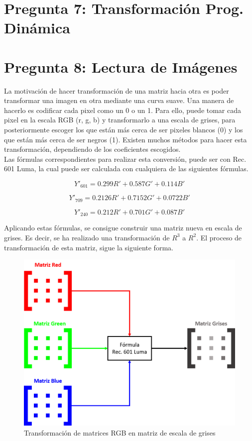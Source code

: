 \documentclass[conference]{IEEEtran}
\begin{document}
\section{Pregunta 7: Transformación Prog. Dinámica}

\section{Pregunta 8: Lectura de Imágenes}
La motivación de hacer transformación de una matriz hacia otra es poder transformar
una imagen en otra mediante una curva suave. Una manera de hacerlo es codificar cada pixel como un 0 o un 1. Para ello, puede tomar cada pixel en la escala RGB (r, g, b) y transformarlo a una escala de grises, para posteriormente escoger los que están más cerca de ser pixeles blancos (0) y los que están más cerca de ser negros (1). Existen muchos métodos para hacer esta transformación, dependiendo de los coeficientes escogidos.\\

Las fórmulas correspondientes para realizar esta conversión, puede ser con Rec. 601 Luma, la cual puede ser calculada con cualquiera de las siguientes fórmulas.

\begin{equation}
    Y'_{601}=0.299R'+0.587G'+0.114B'
\end{equation}

\begin{equation}
    Y'_{709}=0.2126R'+0.7152G'+0.0722B'
\end{equation}

\begin{equation}
    Y'_{240}=0.212R'+0.701G'+0.087B'
\end{equation}

Aplicando estas fórmulas, se consigue construir una matriz nueva en escala de grises. Es decir, se ha realizado una transformación de $R^3$ a $R^2$. El proceso de transformación de esta matriz, sigue la siguiente forma.

\begin{figure}[H]
  \centering
  \includegraphics[scale=0.35]{images/matriz_grises.png}
  \caption[Grises]{Transformación de matrices RGB en matriz de escala de grises}
  \label{fig:grises}
\end{figure}
\end{document}
